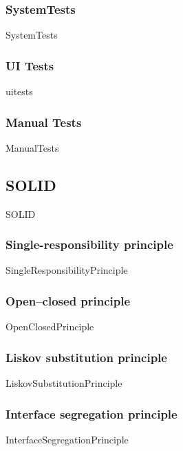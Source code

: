 \documentclass{article}
\begin{document}
        \subsubsection{SystemTests}
            {SystemTests}

        \subsubsection{UI Tests}
            {uitests}

        \subsubsection{Manual Tests}
            {ManualTests}

    \subsection{SOLID}
        {SOLID}

        \subsubsection{Single-responsibility principle}
        \label{kap:SRP}
            {SingleResponsibilityPrinciple}
        
        \subsubsection{Open–closed principle}
            {OpenClosedPrinciple}
        
        \subsubsection{Liskov substitution principle}
            {LiskovSubstitutionPrinciple}
        
        \subsubsection{Interface segregation principle}
            {InterfaceSegregationPrinciple}
        
\end{document}

